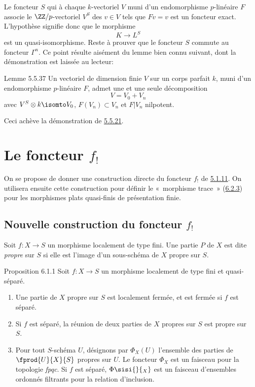 \documentclass[10pt]{../fichiers-configuration-latex/smfart}
\begin{document}
Le foncteur $S$ qui à chaque $k$-vectoriel $V$ muni d'un endomorphisme
$p$-linéaire $F$ associe le $\ZZ/p$-vectoriel $V^{S}$ des $v\in
V$ tels que $Fv=v$ est un foncteur exact. L'hypothèse signifie donc
que le morphisme
$$
K\longrightarrow L^{S}
$$
est un quasi-isomorphisme. Reste à prouver que le foncteur $S$ commute
au foncteur $\Gamma^{n}$. Ce point résulte aisément du lemme bien
connu suivant, dont la démonstration est laissée au lecteur:

\begin{enonce*}{Lemme 5.5.37}
Un vectoriel de dimension finie $V$ sur un corps parfait $k$, muni
d'un endomorphisme $p$-linéaire $F$, admet une et une seule
décomposition
$$
V=V_{0}+V_{n}
$$
avec $V^{S}\otimes k\isomto  V_{0}$, $F(V_{n})\subset V_{n}$
et $F|V_{n}$ nilpotent.
\end{enonce*}

Ceci achève la démonstration de \hyperref[XVII.thm5.5.21]{5.5.21}.

\section[Le foncteur $f_{!}$]{Le foncteur $f_{!}$}\pageoriginale

On se propose de donner une construction directe du foncteur $f_{!}$
de \hyperref[XVII.var5.1.11]{5.1.11}. On utilisera ensuite cette construction pour définir le « morphisme trace »  (\hyperref[XVII.thm6.2.3]{6.2.3}) pour les morphismes plats quasi-finis de
présentation finie.

\subsection[Nouvelle construction du foncteur $f_{!}$]{Nouvelle construction du foncteur $f_{!}$}

Soit $f:X\rightarrow S$ un morphisme localement de type fini. Une
partie $P$ de $X$ est dite \emph{propre} sur $S$ si elle est l'image
d'un sous-schéma de $X$ propre sur $S$.

\begin{enonce*}{Proposition 6.1.1}
Soit $f:X\rightarrow S$ un morphisme localement de type fini et
quasi-séparé.
\begin{enumerate}
\renewcommand{\theenumi}{\roman{enumi}}
\renewcommand{\labelenumi}{(\theenumi)}
\item Une partie de $X$ propre sur $S$ est localement fermée, et est
fermée si $f$ est séparé.

\item Si $f$ est séparé, la réunion de deux parties de $X$ propres sur
$S$ est propre sur $S$.

\item Pour tout $S$-schéma $U$, désignons par $\Phi_{X}(U)$ l'ensemble
des parties de $\fprod{U}{X}{S}$ propres sur $U$. Le foncteur
$\Phi_{X}$ est un faisceau pour la topologie \emph{fpqc}. Si $f$ est
séparé, $\Phi\sisi{}{_X}$ est un faisceau d'ensembles ordonnés filtrants pour la
relation d'inclusion.
\end{enumerate}
\end{enonce*}
\end{document}
